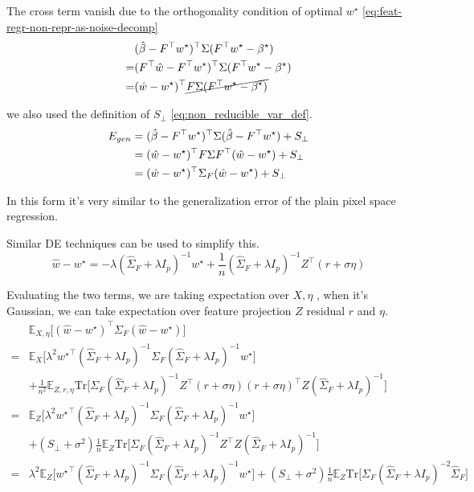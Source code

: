 The cross term vanish due to the orthogonality condition of optimal
$w^{\star}$ \ref{eq:feat-regr-non-repr-as-noise-decomp}
\begin{align*}
 & (\hat{\beta}-F^{\top}w^{\star})^{\top}\Sigma(F^{\top}w^{\star}-{\beta^{\star}})\\
= & (F^{\top}\hat{w}-F^{\top}w^{\star})^{\top}\Sigma(F^{\top}w^{\star}-{\beta^{\star}})\\
= & (\hat{w}-w^{\star})^{\top}\cancel{F\Sigma(F^{\top}w^{\star}-{\beta^{\star}})}
\end{align*}

we also used the definition of $S_{\perp}$ \ref{eq:non_reducible_var_def}.
\begin{align*}
E_{gen} & =(\hat{\beta}-F^{\top}w^{\star})^{\top}\Sigma(\hat{\beta}-F^{\top}w^{\star})+S_{\perp}\\
 & =(\hat{w}-w^{\star})^{\top}F\Sigma F^{\top}(\hat{w}-w^{\star})+S_{\perp}\\
 & =(\hat{w}-w^{\star})^{\top}\Sigma_{F}(\hat{w}-w^{\star})+S_{\perp}
\end{align*}

In this form it's very similar to the generalization error of the
plain pixel space regression.

Similar DE techniques can be used to simplify this.
\[
\hat{w}-w^{\star}=-\lambda(\hat{\Sigma}_{F}+\lambda I_{p})^{-1}w^{\star}+\frac{1}{n}(\hat{\Sigma}_{F}+\lambda I_{p})^{-1}Z^{\top}(r+\sigma\eta)
\]

Evaluating the two terms, we are taking expectation over $X,\eta$
, when it's Gaussian, we can take expectation over feature projection
$Z$ residual $r$ and $\eta$.
\begin{align*}
 & \mathbb{E}_{X,\eta}\big[(\hat{w}-w^{\star})^{\top}\Sigma_{F}(\hat{w}-w^{\star})\big]\\
= & \mathbb{E}_{X}\big[\lambda^{2}{w^\star}^{\top}(\hat{\Sigma}_{F}+\lambda I_{p})^{-1}\Sigma_{F}(\hat{\Sigma}_{F}+\lambda I_{p})^{-1}w^{\star}\big]\\
 & +\frac{1}{n^{2}}\mathbb{E}_{Z,r,\eta}\mathrm{Tr}\big[\Sigma_{F}(\hat{\Sigma}_{F}+\lambda I_{p})^{-1}Z^{\top}(r+\sigma\eta)(r+\sigma\eta)^{\top}Z(\hat{\Sigma}_{F}+\lambda I_{p})^{-1}\big]\\
= & \mathbb{E}_{Z}\big[\lambda^{2}{w^\star}^{\top}(\hat{\Sigma}_{F}+\lambda I_{p})^{-1}\Sigma_{F}(\hat{\Sigma}_{F}+\lambda I_{p})^{-1}w^{\star}\big]\\
 & +(S_{\perp}+\sigma^{2})\frac{1}{n}\mathbb{E}_{Z}\mathrm{Tr}\big[\Sigma_{F}(\hat{\Sigma}_{F}+\lambda I_{p})^{-1}Z^{\top}Z(\hat{\Sigma}_{F}+\lambda I_{p})^{-1}\big]\\
= & \lambda^{2}\mathbb{E}_{Z}\big[{w^\star}^{\top}(\hat{\Sigma}_{F}+\lambda I_{p})^{-1}\Sigma_{F}(\hat{\Sigma}_{F}+\lambda I_{p})^{-1}w^{\star}\big]+(S_{\perp}+\sigma^{2})\frac{1}{n}\mathbb{E}_{Z}\mathrm{Tr}\big[\Sigma_{F}(\hat{\Sigma}_{F}+\lambda I_{p})^{-2}\hat{\Sigma}_{F}\big]
\end{align*}

